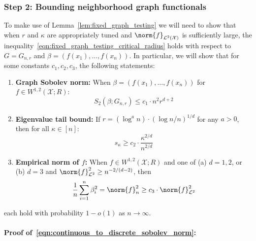 \documentclass{article}
\newcommand{\1}{\mathbf{1}}
\newcommand{\Leb}{\mathcal{L}}
\theoremstyle{alden}
\theoremstyle{aldenthm}
\theoremstyle{definition}
\theoremstyle{remark}
\begin{document}
\subsubsection{Step 2: Bounding neighborhood graph functionals}

To make use of Lemma~\ref{lem:fixed_graph_testing} we will need to show that when $r$ and $\kappa$ are appropriately tuned and $\norm{f}_{\Leb^2(\mathcal{X})}$ is sufficiently large, the inequality~\eqref{eqn:fixed_graph_testing_critical_radius} holds with respect to $G = G_{n,r}$ and $\beta = (f(x_1),\ldots,f(x_n))$. In particular, we will show that for some constants $c_1,c_2,c_3$, the following statements:
\begin{enumerate}[label=(E\arabic*)]
	\item 
	\label{event:discrete_sobolev_norm}
	\textbf{Graph Sobolev norm:} When $\beta = (f(x_1),\ldots,f(x_n))$ for $f \in W^{1,2}(\mathcal{X};R)$:
	\begin{equation}
	\label{eqn:continuous_to_discrete_sobolev_norm}
	S_2(\beta;G_{n,r}) \leq c_1 \cdot n^2 r^{d + 2} 
	\end{equation}
	\item 
	\label{event:eigenvalue_tail_decay}
	\textbf{Eigenvalue tail bound:} If $r = (\log^{a}n)\cdot(\log n/n)^{1/d}$ for any $a > 0$, then for all $\kappa \in [n]$:
	\begin{equation}
	\label{eqn:eigenvalue_tail_bound}
	s_{\kappa} \geq c_2 \cdot \frac{\kappa^{2/d}}{n^{2/d}}
	\end{equation}
	\item 
	\label{event:l2_norm}
	\textbf{Empirical norm of $f$:} When $f \in W^{1,2}(\mathcal{X};R)$ and one of (a) $d = 1,2$, or (b) $d = 3$ and $\norm{f}_{\Leb^2}^2 \geq n^{-2/(d - 2)}$, then
	\begin{equation}
	\label{eqn:l2_to_empirical_norm}
	\frac{1}{n}\sum_{i = 1}^{n}\beta_i^2 = \norm{f}_n^2 \geq c_3 \cdot \norm{f}_{\Leb^2}^2
	\end{equation}
\end{enumerate} 

each hold with probability $1 - o(1)$ as $n \to \infty$.

\paragraph{Proof of~\eqref{eqn:continuous_to_discrete_sobolev_norm}:}
\end{document}

